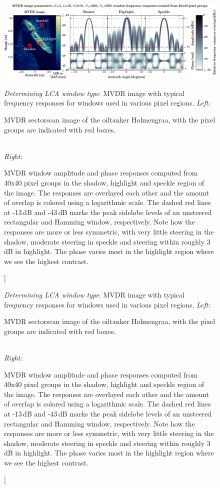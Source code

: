 \documentclass[10pt,journal,draftclsnofoot,onecolumn]{IEEEtran}
\let\MYoriglatexcaption\caption               %
\renewcommand{\caption}[2][\relax]{\MYoriglatexcaption[#2]{#2}}
\newcommand\1{\vec 1}
\begin{document}
\setcounter{topnumber}{1}
\setcounter{dbltopnumber}{1}

\begin{figure}[t]\centering%
\includegraphics[width=\linewidth]{gfx/mvdr_selected_windows_holmengraa.pdf}%
\caption{\emph{Determining LCA window type}: MVDR image with typical frequency responses for windows used in various pixel regions.\newline
\emph{Left:}\hfill
\parbox[t]{.95\linewidth}{MVDR sectorscan image of the oiltanker Holmengraa, with the pixel groups are indicated with red boxes.}\protect\\\hspace{\textwidth}
\emph{Right:}\hfill
\parbox[t]{.95\linewidth}{MVDR window amplitude and phase responses computed from 40x40 pixel groups in the shadow, highlight and speckle region of the image. The responses are overlayed each other and the amount of overlap is colored using a logarithmic scale. The dashed red lines at -13\,dB and -43\,dB marks the peak sidelobe levels of an unsteered rectangular and Hamming window, respectively. Note how the responses are more or less symmetric, with very little steering in the shadow, moderate steering in speckle and steering within roughly 3\,dB in highlight. The phase varies most in the highlight region where we see the highest contrast.} }\label{mvdr_selected_windows}
\end{figure}
\end{document}
